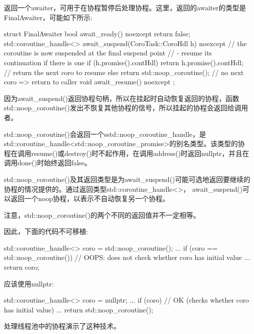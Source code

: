 返回一个awaiter，可用于在协程暂停后处理协程。这里，返回的awaiter的类型是FinalAwaiter，可能如下所示:

\begin{cpp}
struct FinalAwaiter {
	bool await_ready() noexcept {
		return false;
	}
	std::coroutine_handle<> await_suspend(CoroTask::CoroHdl h) noexcept {
		// the coroutine is now suspended at the final suspend point
		// - resume its continuation if there is one
		if (h.promise().contHdl) {
			return h.promise().contHdl; // return the next coro to resume
		}
		else {
			return std::noop_coroutine(); // no next coro => return to caller
		}
	}
	void await_resume() noexcept {
	}
};
\end{cpp}

因为await\_suspend()返回协程句柄，所以在挂起时自动恢复返回的协程，函数std::noop\_coroutine()发出不恢复其他协程的信号，所以挂起的协程会返回给调用者。

std::noop\_coroutine()会返回一个sstd::noop\_coroutine\_handle，是std::coroutine\_handle<std::noop\_coroutine\_promise>的别名类型。该类型的协程在调用resume()或destroy()时不起作用，在调用address()时返回nullptr，并且在调用done()时始终返回false。

std::noop\_coroutine()及其返回类型是为await\_suspend()可能可选地返回要继续的协程的情况提供的。通过返回类型std::coroutine\_handle<>， await\_suspend()可以返回一个noop协程，以表示不自动恢复另一个协程。

注意，std::noop\_coroutine()的两个不同的返回值并不一定相等。

因此，下面的代码不可移植:

\begin{cpp}
std::coroutine_handle<> coro = std::noop_coroutine();
...
if (coro == std::noop_coroutine()) { // OOPS: does not check whether coro has initial value
	...
	return coro;
}
\end{cpp}

应该使用nullptr:

\begin{cpp}
std::coroutine_handle<> coro = nullptr;
...
if (coro) { // OK (checks whether coro has initial value)
	...
	return std::noop_coroutine();
}
\end{cpp}

处理线程池中的协程演示了这种技术。













